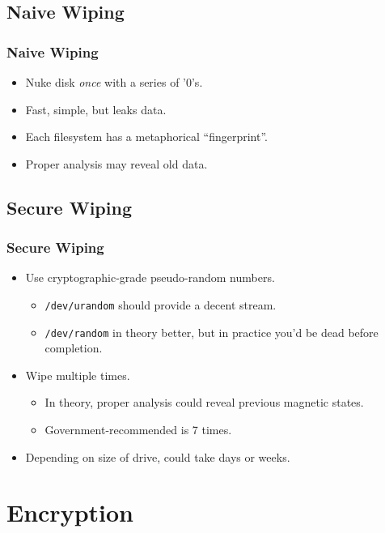 \documentclass[xcolor={dvipsnames,svgnames},hyperref=dvips]{beamer}
\begin{document}
	\subsection{Naive Wiping}
	\begin{frame}
		\frametitle{Naive Wiping}
		\begin{itemize}
		\item Nuke disk \textit{once} with a series of '0's.
		\item Fast, simple, but leaks data.
		\item Each filesystem has a metaphorical ``fingerprint''.
		\item Proper analysis may reveal old data.
		\end{itemize}
	\end{frame}

	\subsection{Secure Wiping}
	\begin{frame}
		\frametitle{Secure Wiping}
		\begin{itemize}
		\item Use cryptographic-grade pseudo-random numbers.
			\begin{itemize}
			\item \texttt{/dev/urandom} should provide a decent stream.
			\item \texttt{/dev/random} in theory better, but in practice you'd be dead before completion.
			\end{itemize}
		\item Wipe multiple times.
			\begin{itemize}
			\item In theory, proper analysis could reveal previous magnetic states.
			\item Government-recommended is 7 times.
			\end{itemize}
		\item Depending on size of drive, could take days or weeks.
		\end{itemize}
	\end{frame}

\section{Encryption}\label{section:encryption}
\end{document}
